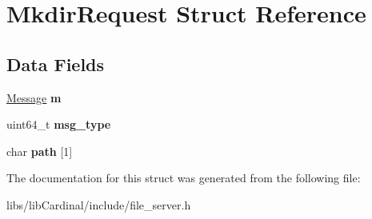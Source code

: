 \hypertarget{structMkdirRequest}{}\section{Mkdir\+Request Struct Reference}
\label{structMkdirRequest}
\subsection*{Data Fields}
\begin{DoxyCompactItemize}
\item 
\hyperlink{structMessage}{Message} {\bfseries m}\hypertarget{structMkdirRequest_a92e65728c84cbab8c52f3f05bb09353c}{}\label{structMkdirRequest_a92e65728c84cbab8c52f3f05bb09353c}

\item 
uint64\+\_\+t {\bfseries msg\+\_\+type}\hypertarget{structMkdirRequest_a9523e02d0f2572aefca95bb5e6cf2722}{}\label{structMkdirRequest_a9523e02d0f2572aefca95bb5e6cf2722}

\item 
char {\bfseries path} \mbox{[}1\mbox{]}\hypertarget{structMkdirRequest_aadde7c589ebe30ab5d0b4f1dab9cd7b4}{}\label{structMkdirRequest_aadde7c589ebe30ab5d0b4f1dab9cd7b4}

\end{DoxyCompactItemize}


The documentation for this struct was generated from the following file\+:\begin{DoxyCompactItemize}
\item 
libs/lib\+Cardinal/include/file\+\_\+server.\+h\end{DoxyCompactItemize}
